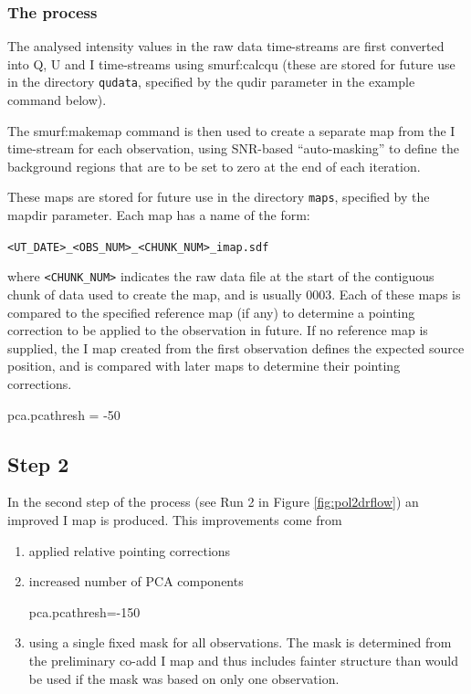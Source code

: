 \subsubsection*{The process}
The analysed intensity values in the raw data time-streams are first
converted into Q, U and I time-streams using smurf:calcqu (these are
stored for future use in the directory \texttt{qudata}, specified by the qudir
parameter in the example command below).

The smurf:makemap command is then used to create a separate map from the
I time-stream for each observation, using SNR-based ``auto-masking'' to
define the background regions that are to be set to zero at the end of
each iteration.

These maps are stored for future use in the directory \texttt{maps},
specified by the mapdir parameter. Each map has a name of the form:

\texttt{<UT\_DATE>\_<OBS\_NUM>\_<CHUNK\_NUM>\_imap.sdf}

where \texttt{<CHUNK\_NUM>} indicates the raw data file at the start of
the contiguous chunk of data used to create the map, and is usually 0003.
Each of these maps is compared to the specified reference map (if any) to
determine a pointing correction to be applied to the observation in
future. If no reference map is supplied, the I map created from the
first observation defines the expected source position, and is compared
with later maps to determine their pointing corrections.

pca.pcathresh = -50



\subsection*{Step 2}

In the second step of the process (see Run 2 in Figure
\ref{fig:pol2drflow}) an improved I map is produced. This improvements
come from
\begin{enumerate}
\item applied relative pointing corrections
\item increased number of PCA components

pca.pcathresh=-150
\item using a single fixed mask for all observations. The mask is
determined from the preliminary co-add I map and thus includes
fainter structure than would be used if the mask was based on only
one observation.
\end{enumerate}


